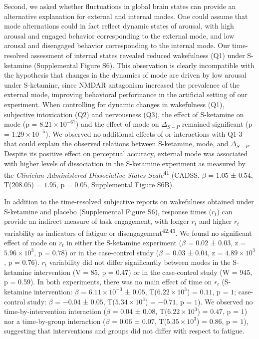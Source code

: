 \documentclass[
]{article}
\begin{document}
Second, we asked whether fluctuations in global brain states can provide
an alternative explanation for external and internal modes. One could
assume that mode alternations could in fact reflect dynamic states of
arousal, with high arousal and engaged behavior corresponding to the
external mode, and low arousal and disengaged behavior corresponding to
the internal mode. Our time-resolved assessment of internal states
revealed reduced wakefulness (Q1) under S-ketamine (Supplemental Figure
S6). This observation is clearly incompatible with the hypothesis that
changes in the dynamics of mode are driven by low arousal under
S-ketamine, since NMDAR antagonism increased the prevalence of the
external mode, improving behavioral performance in the artificial
setting of our experiment. When controlling for dynamic changes in
wakefulness (Q1), subjective intoxication (Q2) and nervousness (Q3), the
effect of S-ketamine on mode (p = \(\ensuremath{8.21\times 10^{-67}}\))
and the effect of mode on \(\Delta_{S-P}\) remained significant (p =
\(\ensuremath{1.29\times 10^{-5}}\)). We observed no additional effects
of or interactions with Q1-3 that could explain the observed relations
between S-ketamine, mode, and \(\Delta_{S-P}\). Despite its positive
effect on perceptual accuracy, external mode was associated with higher
levels of dissociation in the S-ketamine experiment as measured by the
\emph{Clinician-Administered-Dissociative-States-Scale}\textsuperscript{41}
(CADSS, \(\beta\) = \(1.05\) ± \(0.54\), T(\(208.05\)) = \(1.95\), p =
\(0.05\), Supplemental Figure S6B).

In addition to the time-resolved subjective reports on wakefulness
obtained under S-ketamine and placebo (Supplemental Figure S6), response
times (\(r_t\)) can provide an indirect measure of task engagement, with
longer \(r_t\) and higher \(r_t\) variability as indicators of fatigue
or disengagement\textsuperscript{42,43}. We found no significant effect
of mode on \(r_t\) in either the S-ketamine experiment (\(\beta\) =
\(0.02\) ± \(0.03\), z = \(\ensuremath{5.96\times 10^{3}}\), p =
\(0.78\)) or in the case-control study (\(\beta\) = \(0.03\) ± \(0.04\),
z = \(\ensuremath{4.89\times 10^{3}}\), p = \(0.76\)). \(r_t\)
variability did not differ significantly between modes in the S-ketamine
intervention (V = 85, p = 0.47) or in the case-control study (W = 945, p
= 0.59). In both experiments, there was no main effect of time on
\(r_t\) (S-ketamine intervention: \(\beta\) =
\(\ensuremath{6.11\times 10^{-3}}\) ± \(0.05\),
T(\(\ensuremath{6.22\times 10^{3}}\)) = \(0.11\), p = \(1\);
case-control study: \(\beta\) = \(-0.04\) ± \(0.05\),
T(\(\ensuremath{5.34\times 10^{3}}\)) = \(-0.71\), p = \(1\)). We
observed no time-by-intervention interaction (\(\beta\) = \(0.04\) ±
\(0.08\), T(\(\ensuremath{6.22\times 10^{3}}\)) = \(0.47\), p = \(1\))
nor a time-by-group interaction (\(\beta\) = \(0.06\) ± \(0.07\),
T(\(\ensuremath{5.35\times 10^{3}}\)) = \(0.86\), p = \(1\)), suggesting
that interventions and groups did not differ with respect to fatigue.
\end{document}
